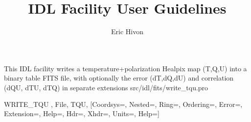 

\renewcommand{\facname}{{write\_tqu }}
\renewcommand{\FACNAME}{{WRITE\_TQU }}
\sloppy

\title{\healpix IDL Facility User Guidelines}
 \section[write\_tqu]{ }
\label{idl:write_tqu}
\author{Eric Hivon}

\begin{facility}
{This IDL facility writes a temperature+polarization Healpix map (T,Q,U) into a
binary table FITS file, 
with optionally the error (dT,dQ,dU) and correlation (dQU, dTU, dTQ)
in separate extensions
}
{src/idl/fits/write\_tqu.pro}
\end{facility}

\begin{IDLformat}
{\FACNAME, File, TQU, [Coordsys=, Nested=, Ring=, Ordering=, Error=, Extension=,
Help=, Hdr=, Xhdr=, Units=, Help=]}
\end{IDLformat}

